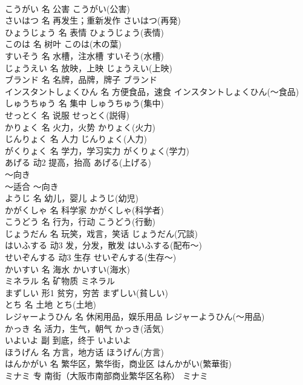 \documentclass[8pt]{extreport}
\begin{document}
\begin{CJK}{UTF8}{min}
\\	こうがい	名	公害	こうがい(公害)	
\\	さいはつ	名	再发生；重新发作	さいはつ(再発)	
\\	ひょうじょう	名	表情	ひょうじょう(表情)	
\\	このは	名	树叶	このは(木の葉)	
\\	すいそう	名	水槽，注水槽	すいそう(水槽)	
\\	じょうえい	名	放映，上映	じょうえい(上映)	
\\	ブランド	名	名牌，品牌，牌子	ブランド	
\\	インスタントしょくひん	名	方便食品，速食	インスタントしょくひん(～食品)	
\\	しゅうちゅう	名	集中	しゅうちゅう(集中)	
\\	せっとく	名	说服	せっとく(説得)	
\\	かりょく	名	火力，火势	かりょく(火力)	
\\	じんりょく	名	人力	じんりょく(人力)	
\\	がくりょく	名	学力，学习实力	がくりょく(学力)	
\\	あげる	动2	提高，抬高	あげる(上げる)	
\\	～向き	
\\	～适合	～向き	
\\	ようじ	名	幼儿，婴儿	ようじ(幼児)	
\\	かがくしゃ	名	科学家	かがくしゃ(科学者)	
\\	こうどう	名	行为，行动	こうどう(行動)	
\\	じょうだん	名	玩笑，戏言，笑话	じょうだん(冗談)	
\\	はいふする	动3	发，分发，散发	はいふする(配布～)	
\\	せいぞんする	动3	生存	せいぞんする(生存～)	
\\	かいすい	名	海水	かいすい(海水)	
\\	ミネラル	名	矿物质	ミネラル	
\\	まずしい	形1	贫穷，穷苦	まずしい(貧しい)	
\\	とち	名	土地	とち(土地)	
\\	レジャーようひん	名	休闲用品，娱乐用品	レジャーようひん(～用品)	
\\	かっき	名	活力，生气，朝气	かっき(活気)	
\\	いよいよ	副	到底，终于	いよいよ	
\\	ほうげん	名	方言，地方话	ほうげん(方言)	
\\	はんかがい	名	繁华区，繁华街，商业区	はんかがい(繁華街)	
\\	ミナミ	专	南街（大阪市南部商业繁华区名称）	ミナミ	

\end{CJK}
\end{document}
